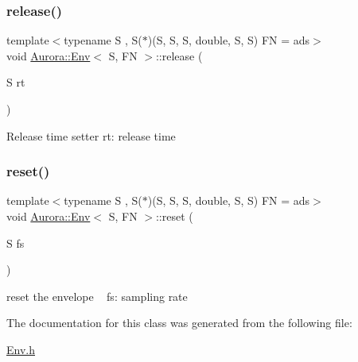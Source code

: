 \subsubsection{\texorpdfstring{release()}{release()}}
{\footnotesize\ttfamily template$<$typename S , S($\ast$)(\+S, S, S, double, S, S) FN = ads$>$ \\
void \hyperlink{class_aurora_1_1_env}{Aurora\+::\+Env}$<$ S, FN $>$\+::release (\begin{DoxyParamCaption}\item[{S}]{rt }\end{DoxyParamCaption})\hspace{0.3cm}{\ttfamily [inline]}}

Release time setter rt\+: release time \mbox{\label{class_aurora_1_1_env_a12db5d285b749a7e1fed988d344d3bc9}} 
\subsubsection{\texorpdfstring{reset()}{reset()}}
{\footnotesize\ttfamily template$<$typename S , S($\ast$)(\+S, S, S, double, S, S) FN = ads$>$ \\
void \hyperlink{class_aurora_1_1_env}{Aurora\+::\+Env}$<$ S, FN $>$\+::reset (\begin{DoxyParamCaption}\item[{S}]{fs }\end{DoxyParamCaption})\hspace{0.3cm}{\ttfamily [inline]}}

reset the envelope ~\newline
fs\+: sampling rate 

The documentation for this class was generated from the following file\+:\begin{DoxyCompactItemize}
\item 
\hyperlink{_env_8h}{Env.\+h}\end{DoxyCompactItemize}
